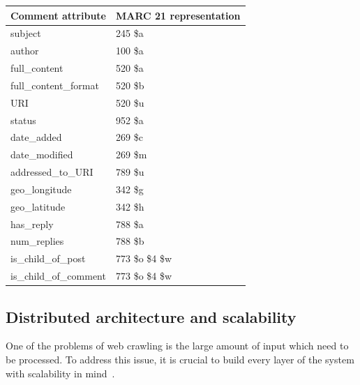 \begin{table}
{\begin{tabular}{@{}ll@{}} \toprule
\textbf{Comment attribute} & \textbf{MARC 21 representation} \\ \hline
subject & 245 \$a\\
author & 100 \$a \\
full\_content & 520 \$a \\
full\_content\_format & 520 \$b \\
URI & 520 \$u\\
status & 952 \$a\\
date\_added & 269 \$c\\
date\_modified & 269 \$m\\
addressed\_to\_URI & 789 \$u\\
geo\_longitude & 342 \$g \\
geo\_latitude & 342 \$h \\
has\_reply & 788 \$a \\
num\_replies & 788 \$b\\
is\_child\_of\_post & 773 \$o \$4 \$w\\
is\_child\_of\_comment & 773 \$o \$4 \$w\\ \hline
\end{tabular}}
\label{table:comment-attributes}
\end{table}

\subsection{Distributed architecture and scalability}
\label{scalability}

One of the problems of web crawling is the large amount 
of input which need to be processed. To address this issue, 
it is crucial to build every layer of the system with scalability in 
mind~\cite{thereactivemanifesto2013}. 


